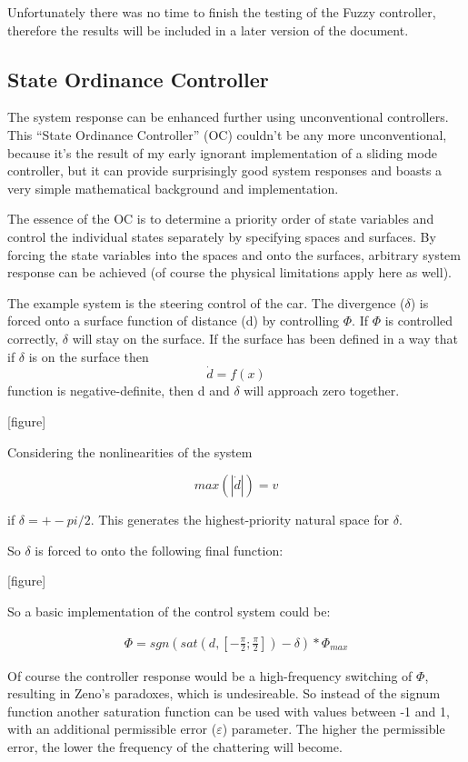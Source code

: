 Unfortunately there was no time to finish the testing of the Fuzzy controller, therefore the results will be included in a later version of the document. 

\subsection{State Ordinance Controller}
The system response can be enhanced further using unconventional controllers. This “State Ordinance Controller” (OC) couldn’t be any more unconventional, because it’s the result of my early ignorant implementation of a sliding mode controller, but it can provide surprisingly good system responses and boasts a very simple mathematical background and implementation.

The essence of the OC is to determine a priority order of state variables and control the individual states separately by specifying spaces and surfaces. By forcing the state variables into the spaces and onto the surfaces, arbitrary system response can be achieved (of course the physical limitations apply here as well).

The example system is the steering control of the car. The divergence ($\delta$) is forced onto a surface function of distance (d) by controlling $\Phi$. If $\Phi$ is controlled correctly, $\delta$ will stay on the surface. If the surface has been defined in a way that if $\delta$ is on the surface then
$$
\dot{d} = f(x)
$$
function is negative-definite, then d and $\delta$ will approach zero together.

[figure]

Considering the nonlinearities of the system

$$
max(|\dot{d}|) = v
$$

if $\delta = +-pi/2$. This generates the highest-priority natural space for $\delta$.

So $\delta$ is forced to onto the following final function:

[figure]

So a basic implementation of the control system could be:

\begin{align}
	\Phi = sgn(sat(d,[-\frac{\pi}{2};\frac{\pi}{2}]) - \delta) * \Phi_{max}
\end{align}

Of course the controller response would be a high-frequency switching of $\Phi$, resulting in Zeno's paradoxes, which is undesireable. So instead of the signum function another saturation function can be used with values between -1 and 1, with an additional permissible error ($\varepsilon$) parameter. The higher the permissible error, the lower the frequency of the chattering will become.

